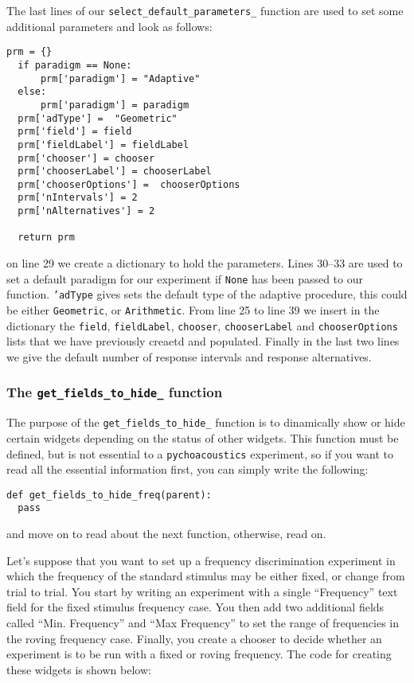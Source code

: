 The last lines of our \texttt{select\_default\_parameters\_} function are used to set some additional parameters and look as follows:
\begin{lstlisting}[firstnumber=29]
  prm = {}
  if paradigm == None:
      prm['paradigm'] = "Adaptive"
  else:
      prm['paradigm'] = paradigm
  prm['adType'] =  "Geometric"
  prm['field'] = field
  prm['fieldLabel'] = fieldLabel
  prm['chooser'] = chooser
  prm['chooserLabel'] = chooserLabel
  prm['chooserOptions'] =  chooserOptions
  prm['nIntervals'] = 2
  prm['nAlternatives'] = 2

  return prm
\end{lstlisting}
on line 29 we create a dictionary to hold the parameters. Lines 30--33 are used to
set a default paradigm for our experiment if \texttt{None} has been passed to our function.
\texttt{'adType} gives sets the default type of the adaptive procedure, this could be either \texttt{Geometric}, or 
\texttt{Arithmetic}. From line 25 to line 39 we insert in the dictionary the \texttt{field}, \texttt{fieldLabel},
\texttt{chooser}, \texttt{chooserLabel} and \texttt{chooserOptions} lists that we have previously creaetd and populated.
Finally in the last two lines we give the default number of response intervals and response alternatives.

\subsubsection{The \texttt{get\_fields\_to\_hide\_} function}

The purpose of the \verb+get_fields_to_hide_+ function is to dinamically show or
hide certain widgets depending on the status of other widgets. This function must
be defined, but is not essential to a \texttt{pychoacoustics} experiment, so if you want to read
all the essential information first, you can simply write the following:
\begin{lstlisting}
def get_fields_to_hide_freq(parent):
  pass
\end{lstlisting}
and move on to read about the next function, otherwise, read on.

Let's suppose that you 
want to set up a frequency discrimination experiment in which the frequency of the 
standard stimulus may be either fixed, or change from trial to trial. You start by writing
an experiment with a single ``Frequency'' text field for the fixed stimulus frequency case.
You then add two additional fields called ``Min. Frequency'' and ``Max Frequency'' to set
the range of frequencies in the roving frequency case. Finally, you create a chooser to decide
whether an experiment is to be run with a fixed or roving frequency. The code for creating these widgets
is shown below:



